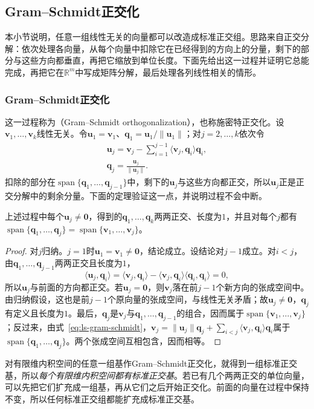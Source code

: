 \subsection{Gram--Schmidt正交化}
\label{sec:ls-orthonormal-basis-construction}

本小节说明，任意一组线性无关的向量都可以改造成标准正交组。思路来自正交分解：依次处理各向量，从每个向量中扣除它在已经得到的方向上的分量，剩下的部分与这些方向都垂直，再把它缩放到单位长度。下面先给出这一过程并证明它总能完成，再把它在$\mathbb R^m$中写成矩阵分解，最后处理各列线性相关的情形。

\subsubsection{Gram--Schmidt正交化}

这一过程称为（Gram--Schmidt orthogonalization），也称施密特正交化。设$\bm v_1,\ldots,\bm v_k$线性无关。令$\bm u_1=\bm v_1$、$\bm q_1=\bm u_1/\lVert\bm u_1\rVert$；对$j=2,\ldots,k$依次令
\begin{equation}
\begin{gathered}
\bm u_j=\bm v_j-\sum_{i=1}^{j-1}\langle\bm v_j,\bm q_i\rangle\bm q_i,\\
\bm q_j=\frac{\bm u_j}{\lVert\bm u_j\rVert}.
\end{gathered}
\label{eq:ls-gram-schmidt}
\end{equation}
扣除的部分在$\operatorname{span}\{\bm q_1,\ldots,\bm q_{j-1}\}$中，剩下的$\bm u_j$与这些方向都正交，所以$\bm u_j$正是正交分解中的剩余分量。下面的定理验证这一点，并说明过程不会中断。
\begin{theorem}
\label{thm:ls-gram-schmidt}
上述过程中每个$\bm u_j\neq\bm0$，得到的$\bm q_1,\ldots,\bm q_k$两两正交、长度为$1$，并且对每个$j$都有$\operatorname{span}\{\bm q_1,\ldots,\bm q_j\}=\operatorname{span}\{\bm v_1,\ldots,\bm v_j\}$。
\end{theorem}
\begin{proof}
对$j$归纳。$j=1$时$\bm u_1=\bm v_1\neq\bm0$，结论成立。设结论对$j-1$成立。对$i<j$，由$\bm q_1,\ldots,\bm q_{j-1}$两两正交且长度为$1$，
\[
 \langle\bm u_j,\bm q_i\rangle=\langle\bm v_j,\bm q_i\rangle-\langle\bm v_j,\bm q_i\rangle\langle\bm q_i,\bm q_i\rangle=0,
\]
所以$\bm u_j$与前面的方向都正交。若$\bm u_j=\bm0$，则$\bm v_j$落在前$j-1$个新方向的张成空间中。由归纳假设，这也是前$j-1$个原向量的张成空间，与线性无关矛盾；故$\bm u_j\neq\bm0$，$\bm q_j$有定义且长度为$1$。最后，$\bm q_j$是$\bm v_j$与$\bm q_1,\ldots,\bm q_{j-1}$的组合，因而属于$\operatorname{span}\{\bm v_1,\ldots,\bm v_j\}$；反过来，由式~\eqref{eq:ls-gram-schmidt}，$\bm v_j=\lVert\bm u_j\rVert\bm q_j+\sum_{i<j}\langle\bm v_j,\bm q_i\rangle\bm q_i$属于$\operatorname{span}\{\bm q_1,\ldots,\bm q_j\}$。两个张成空间互相包含，因而相等。
\end{proof}
对有限维内积空间的任意一组基作Gram--Schmidt正交化，就得到一组标准正交基，所以\emph{每个有限维内积空间都有标准正交基}。若已有几个两两正交的单位向量，可以先把它们扩充成一组基，再从它们之后开始正交化。前面的向量在过程中保持不变，所以任何标准正交组都能扩充成标准正交基。

